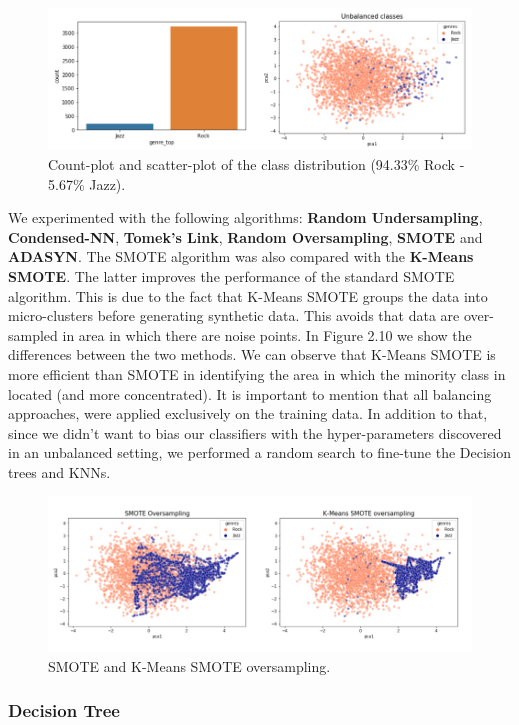 \begin{figure}[!htb]
  \centering 
  \includegraphics[width=0.72\linewidth]{images/countplot-scatter_Jazz-Rock.png}
  \caption{Count-plot and scatter-plot of the class distribution (94.33\% Rock - 5.67\% Jazz).}
\end{figure}

We experimented with the following algorithms: \textbf{Random Undersampling}, \textbf{Condensed-NN}, \textbf{Tomek's Link}, \textbf{Random Oversampling}, \textbf{SMOTE} and \textbf{ADASYN}. The SMOTE algorithm was also compared with the \textbf{K-Means SMOTE}. The latter improves the performance of the standard SMOTE algorithm. This is due to the fact that K-Means SMOTE groups the data into micro-clusters before generating synthetic data. This avoids that data are over-sampled in area in which there are noise points. In Figure 2.10 we show the differences between the two methods. We can observe that K-Means SMOTE is more efficient than SMOTE in identifying the area in which the minority class in located (and more concentrated).
It is important to mention that all balancing approaches, were applied exclusively on the training data. In addition to that, since we didn't want to bias our classifiers with the hyper-parameters discovered in an unbalanced setting, we performed a random search to fine-tune the Decision trees and KNNs. 

\begin{figure}[!htb]
  \centering 
  \includegraphics[width=0.75\linewidth]{images/SMOTE_KSMOTE.png}
  \caption{SMOTE and K-Means SMOTE oversampling.}
\end{figure}

\subsubsection{Decision Tree}


